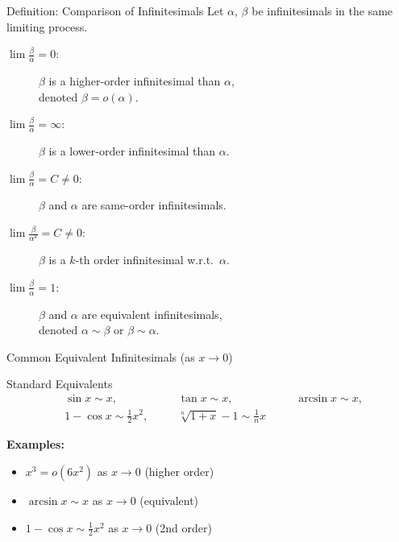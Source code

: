\documentclass[UTF8,10pt]{beamer}
\begin{document}
\begin{frame}{Definition: Comparison of Infinitesimals}
Let $\alpha$, $\beta$ be infinitesimals in the same limiting process.
\pause
\begin{description}
    \item[$\lim\frac{\beta}{\alpha}=0$:] $\beta$ is a \alert{higher-order} infinitesimal than $\alpha$,\\
          denoted $\beta = o(\alpha)$.
    \pause
    \item[$\lim\frac{\beta}{\alpha}=\infty$:] $\beta$ is a \alert{lower-order} infinitesimal than $\alpha$.
    \pause
    \item[$\lim\frac{\beta}{\alpha}=C\neq 0$:] $\beta$ and $\alpha$ are \alert{same-order} infinitesimals.
    \pause
    \item[$\lim\frac{\beta}{\alpha^k}=C\neq 0$:] $\beta$ is a \alert{$k$-th order} infinitesimal w.r.t.\ $\alpha$.
    \pause
    \item[$\lim\frac{\beta}{\alpha}=1$:] $\beta$ and $\alpha$ are \alert{equivalent} infinitesimals,\\
          denoted $\alpha \sim \beta$ or $\beta \sim \alpha$.
\end{description}
\end{frame}

\begin{frame}{Common Equivalent Infinitesimals (as $x \to 0$)}
\begin{block}{Standard Equivalents}
\begin{align*}
&\sin x \sim x, &\quad &\tan x \sim x, &\quad &\arcsin x \sim x, \\[0.3em]
&1-\cos x \sim \tfrac{1}{2}x^2, &\quad &\sqrt[n]{1+x}-1 \sim \tfrac{1}{n}x
\end{align*}
\end{block}
\pause
\vspace{0.3em}
\textbf{Examples:}
\begin{itemize}
    \item<2-> $x^3 = o(6x^2)$ as $x \to 0$ \quad (higher order)
    \item<3-> $\arcsin x \sim x$ as $x \to 0$ \quad (equivalent)
    \item<4-> $1-\cos x \sim \frac{1}{2}x^2$ as $x \to 0$ \quad (2nd order)
\end{itemize}
\end{frame}
\end{document}
